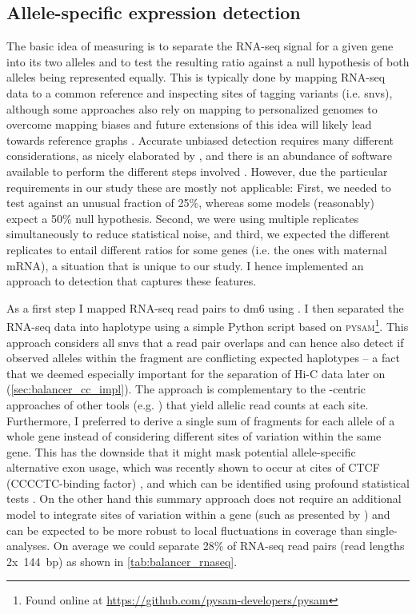 \subsection{Allele-specific expression detection}
\label{sec:balancer_ase_impl}

The basic idea of measuring \ase is to separate the RNA-seq signal for a given
gene into its two alleles and to test the resulting ratio against a null
hypothesis of both alleles being represented equally. This is typically done by
mapping RNA-seq data to a common reference and inspecting sites of tagging
variants (i.e. \acp{snv}), although some approaches also rely on mapping to
personalized genomes to overcome mapping biases \citep{Rozowsky2014} and future
extensions of this idea will likely lead towards reference graphs
\citep{Dilthey2015,Marschall2016,Novak101378}. Accurate unbiased \ase detection
requires many different considerations, as nicely elaborated by \cite{Castel2015},
and there is an abundance of software available to perform the different steps
involved \citep{Skelly2011,Mayba2014,Harvey2014,Pirinen2015,Romanel2015,VandeGeijn2015,Liu2016}.
However, due the particular requirements in our study these are mostly not
applicable: First, we needed to test \ase against an unusual fraction of 25\%,
whereas some models (reasonably) expect a 50\% null hypothesis. Second, we were
using multiple replicates simultaneously to reduce statistical noise, and third,
we expected the different replicates to entail different \ase ratios for some
genes (i.e. the ones with maternal mRNA), a situation that is unique to our
study. I hence implemented an approach to \ase detection that captures these
features.

As a first step I mapped RNA-seq read pairs to \ac{dm6} using \STAR. I then
separated the RNA-seq data into haplotype using a simple Python script based on
\textsc{pysam}\footnote{Found online at \url{https://github.com/pysam-developers/pysam}}.
This approach considers all \acp{snv} that a read pair overlaps and can hence
also detect if observed alleles within the fragment are conflicting expected
haplotypes – a fact that we deemed especially important for the separation of
Hi-C data later on (\cref{sec:balancer_cc_impl}). The approach is complementary
to the \snv-centric approaches of other tools (e.g. \cite{Castel2015}) that
yield allelic read counts at each site. Furthermore, I preferred to derive a
single sum of fragments for each allele of a whole gene instead of considering
different sites of variation within the same gene. This has the downside that
it might mask potential allele-specific alternative exon usage, which was
recently shown to occur at cites of CTCF (CCCCTC-binding factor)
\citep{Ruiz-Velasco2017}, and which can be identified using profound
statistical tests \citep[for instance]{Skelly2011}. On the other hand this
summary approach does not require an additional model to integrate sites of
variation within a gene (such as presented by \cite{Mayba2014}) and can be
expected to be more robust to local fluctuations in coverage than single-\snv
analyses. On average we could separate 28\% of RNA-seq read pairs (read lengths
2x~144~bp) as shown in \cref{tab:balancer_rnaseq}.

